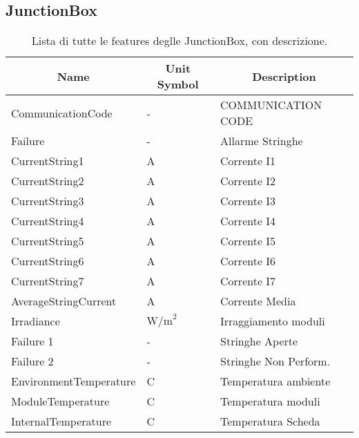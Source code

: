 \subsection{JunctionBox}

\begin{table}[H]
	\begin{center}
		\begin{tabular}[c]{l|l|l}
			\hline
			\multicolumn{1}{c|}{\textbf{Name}}        &
			\multicolumn{1}{c|}{\textbf{Unit Symbol}} &
			\multicolumn{1}{c}{\textbf{Description}}                                           \\
			\hline
			CommunicationCode                         & -              & COMMUNICATION CODE    \\
			Failure                                   & -              & Allarme Stringhe      \\
			CurrentString1                            & A              & Corrente I1           \\
			CurrentString2                            & A              & Corrente I2           \\
			CurrentString3                            & A              & Corrente I3           \\
			CurrentString4                            & A              & Corrente I4           \\
			CurrentString5                            & A              & Corrente I5           \\
			CurrentString6                            & A              & Corrente I6           \\
			CurrentString7                            & A              & Corrente I7           \\
			AverageStringCurrent                      & A              & Corrente Media        \\
			Irradiance                                & $\text{W/m}^2$ & Irraggiamento moduli  \\
			Failure 1                                 & -              & Stringhe Aperte       \\
			Failure 2                                 & -              & Stringhe Non Perform. \\
			EnvironmentTemperature                    & C              & Temperatura ambiente  \\
			ModuleTemperature                         & C              & Temperatura moduli    \\
			InternalTemperature                       & C              & Temperatura Scheda    \\
			\hline
		\end{tabular}
		\caption{Lista di tutte le features deglle JunctionBox, con descrizione.}\label{tab:junctionfeatures}
	\end{center}
\end{table}


